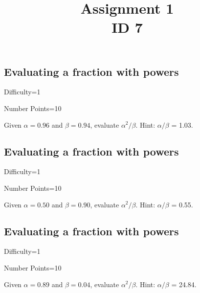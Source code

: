 \documentclass{article}
\title{Assignment 1 \\ ID 7}
\begin{document}
\maketitle

\section{} 



\subsection{Evaluating a fraction with powers}

Difficulty=1

Number Points=10

Given $\alpha = 0.96$ and $\beta = 0.94$, evaluate $\alpha^{2}/\beta$. Hint: $\alpha/\beta$ = 1.03.

\subsection{Evaluating a fraction with powers}

Difficulty=1

Number Points=10

Given $\alpha = 0.50$ and $\beta = 0.90$, evaluate $\alpha^{2}/\beta$. Hint: $\alpha/\beta$ = 0.55.

\subsection{Evaluating a fraction with powers}

Difficulty=1

Number Points=10

Given $\alpha = 0.89$ and $\beta = 0.04$, evaluate $\alpha^{2}/\beta$. Hint: $\alpha/\beta$ = 24.84.
\end{document}
